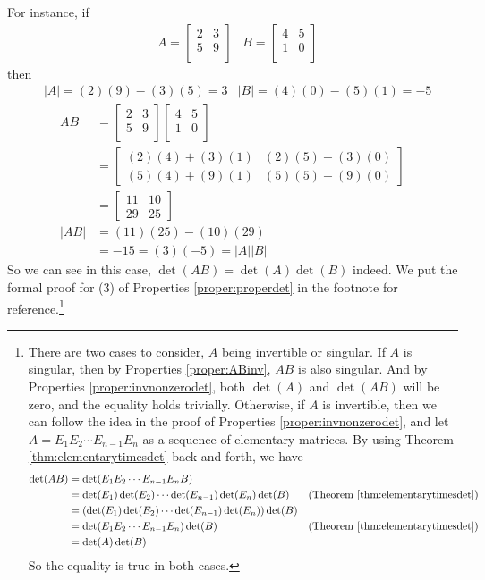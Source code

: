 For instance, if
\begin{align*}
&A = 
\begin{bmatrix}
2 & 3 \\
5 & 9 \\
\end{bmatrix}
&B = 
\begin{bmatrix}
4 & 5 \\
1 & 0 \\
\end{bmatrix}
\end{align*}
then
\begin{align*}
&|A| = (2)(9) - (3)(5) = 3 
&|B| = (4)(0) - (5)(1) = -5
\end{align*}
\begin{align*}
AB &= 
\begin{bmatrix}
2 & 3 \\
5 & 9 \\
\end{bmatrix}
\begin{bmatrix}
4 & 5 \\
1 & 0 \\
\end{bmatrix} \\
&= 
\begin{bmatrix}
(2)(4)+(3)(1) & (2)(5)+(3)(0) \\
(5)(4)+(9)(1) & (5)(5)+(9)(0)
\end{bmatrix} \\
&= 
\begin{bmatrix}
11 & 10 \\
29 & 25
\end{bmatrix} \\
|AB| &= (11)(25) - (10)(29) \\
&= -15 = (3)(-5) = |A||B|
\end{align*}
So we can see in this case, $\det(AB) = \det(A)\det(B)$ indeed. We put the formal proof for (3) of Properties \ref{proper:properdet} in the footnote for reference.\footnote{There are two cases to consider, $A$ being invertible or singular. If $A$ is singular, then by Properties \ref{proper:ABinv}, $AB$ is also singular. And by Properties \ref{proper:invnonzerodet}, both $\det(A)$ and $\det(AB)$ will be zero, and the equality holds trivially. Otherwise, if $A$ is invertible, then we can follow the idea in the proof of Properties \ref{proper:invnonzerodet}, and let $A = E_{1}E_{2} \cdots E_{n-1}E_n$ as a sequence of elementary matrices. By using Theorem \ref{thm:elementarytimesdet} back and forth, we have
\begin{align*}
\det(AB) &= \det(E_{1}E_{2} \cdots E_{n-1}E_nB) \\
&= \det(E_1) \det(E_{2}) \cdots \det(E_{n-1})\det(E_n)\det(B) & \text{(Theorem \ref{thm:elementarytimesdet})} \\
&= (\det(E_1) \det(E_{2}) \cdots \det(E_{n-1})\det(E_n))\det(B) \\
&= \det(E_{1}E_{2} \cdots E_{n-1}E_n)\det(B) & \text{(Theorem \ref{thm:elementarytimesdet})} \\
&= \det(A)\det(B)
\end{align*}
So the equality is true in both cases.}


